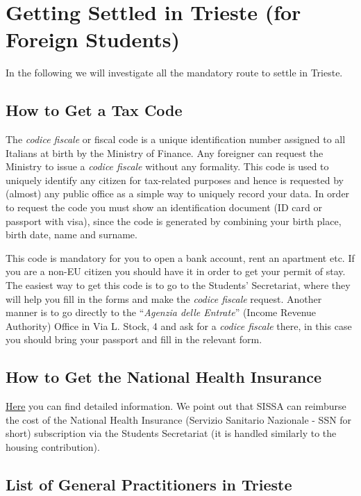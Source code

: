 \documentclass{sissavademecum}
\begin{document}
\chapter{Getting Settled in Trieste (for Foreign Students)}

In the following we will investigate all the mandatory route to settle in Trieste.


\section{How to Get a Tax Code}

The \textit{codice fiscale} or fiscal code is a unique identification number assigned to all Italians at birth by the Ministry of Finance. Any foreigner can request the Ministry to issue a \textit{codice fiscale} without any formality. This code is used to uniquely identify any citizen for tax-related purposes and hence is requested by (almost) any public office as a simple way to uniquely record your data. In order to request the code you must show an identification document (ID card or passport with visa), since the code is generated by combining your birth place, birth date, name and surname.

This code is mandatory for you to open a bank account, rent an apartment etc. If you are a non-EU citizen you should have it in order to get your permit of stay. The easiest way to get this code is to go to the Students' Secretariat, where they will help you fill in the forms and make the \textit{codice fiscale} request. Another manner is to go directly to the ``\textit{Agenzia delle Entrate}'' (Income Revenue Authority) Office in Via L. Stock, 4 and ask for a \textit{codice fiscale} there, in this case you should bring your passport and fill in the relevant form. 


\section{How to Get the National Health Insurance}

\href{http://wiki.sissa.it/students/index.php/Health_Insurance}{Here} you can find detailed information. We point out that SISSA can reimburse the cost of the National Health Insurance (Servizio Sanitario Nazionale - SSN for short) subscription via the Students Secretariat (it is handled similarly to the housing contribution).


\section{List of General Practitioners in Trieste}
\end{document}
